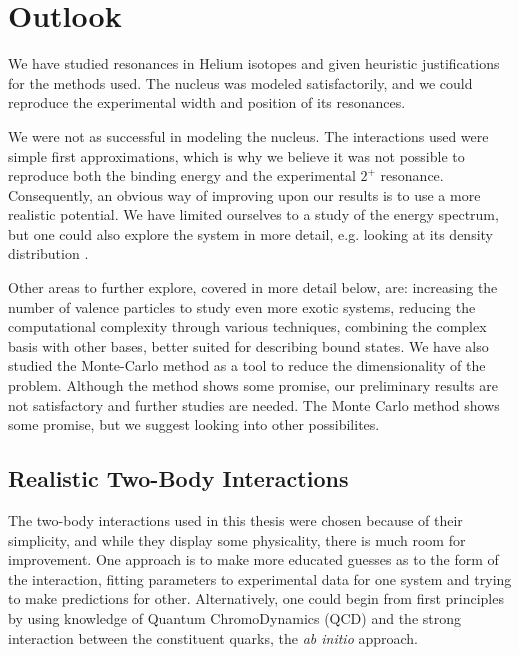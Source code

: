 \documentclass[../main/report.tex]{subfiles}
\begin{document}
\chapter{Outlook}
\label{cha:outlook}


We have studied resonances in Helium isotopes and given heuristic justifications for the methods used. The  nucleus was modeled satisfactorily, and we could reproduce the experimental width and position of its resonances.

We were not as successful in modeling the  nucleus. The interactions used were simple first approximations, which is why we believe it was not possible to reproduce both the binding energy and the experimental {$2^+$} resonance. Consequently, an obvious way of improving upon our results is to use a more realistic potential. We have limited ourselves to a study of the energy spectrum, but one could also explore the  system in more detail, e.g. looking at its density distribution \cite{radii}.

Other areas to further explore, covered in more detail below, are: increasing the number of valence particles to study even more exotic systems, reducing the computational complexity through various techniques, combining the complex basis with other bases, better suited for describing bound states.
We have also studied the Monte-Carlo method as a tool to reduce the dimensionality of the problem. Although the method shows some promise, our preliminary results are not satisfactory and further studies are needed.
The Monte Carlo method shows some promise, but we suggest looking into other possibilites.

\section{Realistic Two-Body Interactions}
The two-body interactions used in this thesis were chosen because of their simplicity, and while they display some physicality, there is much room for improvement. 
One approach is to make more educated guesses as to the form of the interaction, fitting parameters to experimental data for one system and trying to make predictions for other.
Alternatively, one could begin from first principles by using knowledge of Quantum ChromoDynamics (QCD) and the strong interaction between the constituent quarks, the \emph{ab initio} approach.
\end{document}
